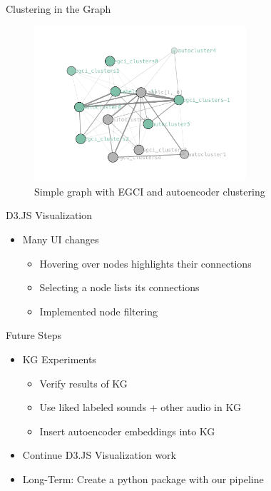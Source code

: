 \begin{frame}{Clustering in the Graph}
    \begin{figure}
        \centering
        \includegraphics[height=0.7\textheight,width=0.7\textwidth,keepaspectratio]{images/graph_clustering.png}
        \caption{Simple graph with EGCI and autoencoder clustering}
    \end{figure}
    
\end{frame}

\begin{frame}{D3.JS Visualization}
    \begin{itemize}
        \item Many UI changes
        \begin{itemize}
            \item Hovering over nodes highlights their connections
            \item Selecting a node lists its connections
            \item Implemented node filtering
        \end{itemize}
    \end{itemize}
\end{frame}

\begin{frame}{Future Steps}
    \begin{itemize}
        \item KG Experiments
        \begin{itemize}
            \item Verify results of KG
            \item Use liked labeled sounds + other audio in KG
            \item Insert autoencoder embeddings into KG
        \end{itemize}
        \item Continue D3.JS Visualization work
        \item Long-Term: Create a python package with our pipeline
    \end{itemize}
\end{frame}

